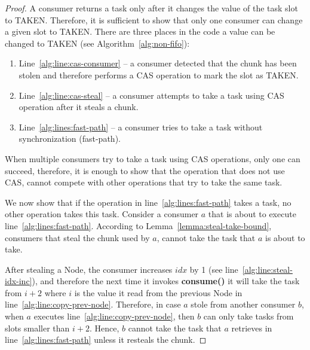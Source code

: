 \begin{proof}
A consumer returns a task only after it changes the value of the task slot to TAKEN. 
Therefore, it is sufficient to show that only one consumer can change a given slot to TAKEN.
There are three places in the code a value can be changed to TAKEN (see Algorithm~\ref{alg:non-fifo}):
\begin{enumerate}
 \item Line~\ref{alg:line:cas-consumer} -- a consumer detected that the chunk has been stolen and therefore performs a CAS operation to mark the slot as TAKEN.
 \item Line~\ref{alg:line:cas-steal} -- a consumer attempts to take a task using CAS operation after it steals a chunk.
 \item Line~\ref{alg:lines:fast-path} -- a consumer tries to take a task without synchronization (fast-path).
\end{enumerate}

When multiple consumers try to take a task using CAS operations, only one can succeed, therefore, it is enough to show that the operation that does not use CAS, cannot compete with other operations that try to take the same task.

We now show that if the operation in line~\ref{alg:lines:fast-path} takes a task, no other operation takes this task. 
Consider a consumer $a$ that is about to execute line~\ref{alg:lines:fast-path}.
According to Lemma~\ref{lemma:steal-take-bound}, consumers that steal the chunk used by $a$, cannot take the task that $a$ is about to take.

After stealing a Node, the consumer increases $idx$ by 1 (see line~\ref{alg:line:steal-idx-inc}), and therefore the next time it invokes {\bf consume()} it will take the task from $i+2$ where $i$ is the value it read from the previous Node in line~\ref{alg:line:copy-prev-node}. Therefore, in case $a$ stole from another consumer $b$, when $a$ executes line~\ref{alg:line:copy-prev-node}, then $b$ can only take tasks from slots smaller than $i+2$. Hence, $b$ cannot take the task that $a$ retrieves in line~\ref{alg:lines:fast-path} unless it resteals the chunk. 
\end{proof}
